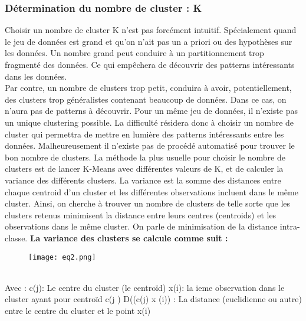 \documentclass{article}
\begin{document}
\subsubsection{Détermination du nombre de cluster : K}
Choisir un nombre de cluster K n’est pas forcément intuitif. Spécialement quand le jeu de données est grand et qu’on n’ait pas un a priori ou des hypothèses sur les données. Un nombre  grand peut conduire à un partitionnement trop fragmenté des données. Ce qui empêchera de découvrir des patterns intéressants dans les données. \\
Par contre, un nombre de clusters trop petit, conduira à avoir, potentiellement, des clusters trop généralistes contenant beaucoup de données. Dans ce cas, on n’aura pas de patterns à découvrir.
Pour un même jeu de données, il n’existe pas un unique clustering possible. La difficulté résidera donc à choisir un nombre de cluster   qui permettra de mettre en lumière des patterns intéressants entre les données. Malheureusement il n’existe pas de procédé automatisé pour trouver le bon nombre de clusters.
La méthode la plus usuelle pour choisir le nombre de clusters est de lancer K-Means avec différentes valeurs de K, et de calculer la variance des différents clusters.  La variance est la somme des distances entre chaque centroid d’un cluster et les différentes observations incluent dans le même cluster. Ainsi, on cherche à trouver un nombre de clusters   de telle sorte que les clusters retenus minimisent la distance entre leurs centres (centroids) et les observations dans le même cluster. On parle de minimisation de la distance intra-classe.
\textbf{La variance des clusters se calcule comme suit :}\\
\begin{figure}[h]
   \centering
   \texttt{[image: eq2.png]}
\end{figure}
\\Avec :
	  c(j): Le centre du cluster (le centroïd)
	  x(i): la ieme observation dans le cluster ayant pour centroïd c(j  ) 
	  D((c(j) x (i)) : La distance (euclidienne ou autre) entre le centre du cluster et le point x(i)\\
\end{document}
